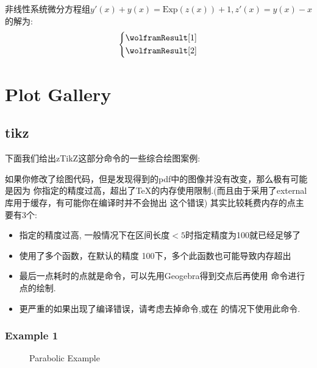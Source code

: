 \documentclass[
  hyper,    
  lang=cn,
  class=book,
  bib_index={load},
  mathSpec={envStyle=leftbar, alias},
  toc={column=2, title=目录},
]{zlatex}
\let\cmd\ztexverb
\begin{document}
非线性系统微分方程组$y'(x) + y(x) = \mathrm{Exp}(z(x))+1, z'(x) = y(x)-x$的解为:
\begin{align}
    \left\{\begin{aligned}
        & \wolframResult[1]\\ 
        & \wolframResult[2] 
    \end{aligned}\right.
\end{align}







\section{Plot Gallery}\label{sec:gallery}
\subsection{tikz}
下面我们给出zTikZ这部分命令的一些综合绘图案例:
\begin{leftbar}
\noindent 如果你修改了绘图代码，但是发现得到的pdf中的图像并没有改变，那么极有可能是因为
你指定的精度过高，超出了\TeX{}的内存使用限制.(而且由于采用了external库用于缓存，有可能你在编译时并不会抛出
这个错误) 其实比较耗费内存的点主要有3个:
\begin{itemize}
    \item 指定的精度过高, 一般情况下在区间长度$<5$时指定精度为100就已经足够了
    \item 使用了多个\cmd{\ContourPlot}函数，在默认的精度 100下，多个此函数也可能导致内存超出
    \item 最后一点耗时的点就是\cmd{\ShowIntersecion}命令，可以先用Geogebra得到交点后再使用
        \cmd{\ShowPoint}命令进行点的绘制.
    \item 更严重的如果出现了编译错误，请考虑去掉\cmd{\ShadePlot}命令,或在\cmd{\usepackage[external=false]{ztikz}}
        的情况下使用此命令.
\end{itemize}
\end{leftbar}


\subsubsection{Example 1}
\begin{figure}[!htb]
    \centering
    
    \caption{Parabolic Example}
    \label{fig:1-parabolic}
\end{figure}
\inputminted{latex}{./example_1.tex}
\newpage
\end{document}
